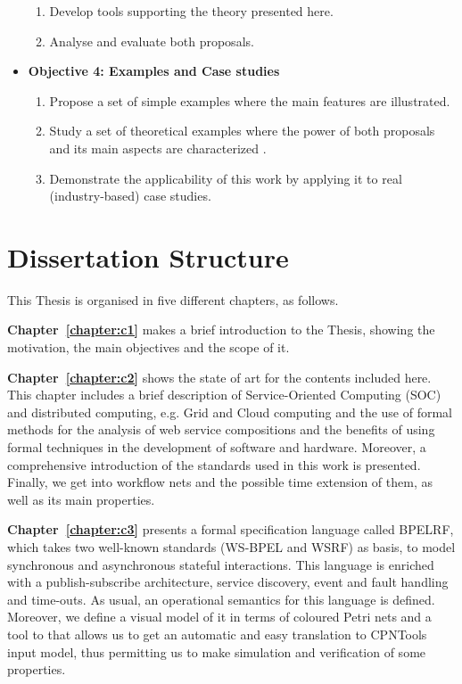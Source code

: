 \begin{itemize}
\begin{enumerate}
\item Develop tools supporting the theory presented here.

\item Analyse and evaluate both proposals.

\end{enumerate}

\item \textbf{Objective 4: Examples and Case studies}

\begin{enumerate}

\item Propose a set of simple examples where the main features are illustrated.
\item Study a set of theoretical examples where the power of both proposals and its main aspects are characterized .
\item Demonstrate the applicability of this work by applying it to real (industry-based) case studies.
\end{enumerate}

\end{itemize}

\section{Dissertation Structure}\label{structure}

This Thesis is organised in five different chapters, as follows.

\textbf{Chapter~\ref{chapter:c1}} makes a brief introduction to the Thesis, showing the motivation, the main objectives and the scope of it.

\textbf{Chapter~\ref{chapter:c2}} shows the state of art for the contents included here. This chapter includes a brief description of Service-Oriented Computing (SOC) and distributed computing, e.g. Grid and Cloud computing and the use of formal methods for the analysis of web service compositions and the benefits of using formal techniques in the development of software and hardware. Moreover, a comprehensive introduction of the standards used in this work is presented. Finally, we get into workflow nets and the possible time extension of them, as well as its main properties.

\textbf{Chapter~\ref{chapter:c3}} presents a formal specification language called BPELRF, which takes two well-known standards (WS-BPEL and WSRF) as basis, to model synchronous and asynchronous stateful interactions. This language is enriched with a publish-subscribe architecture, service discovery, event and fault handling and time-outs. As usual, an operational semantics for this language is defined. Moreover, we define a visual model of it in terms of coloured Petri nets and a tool to that allows us to get an automatic and easy translation to CPNTools input model, thus permitting us to make simulation and verification of some properties.

